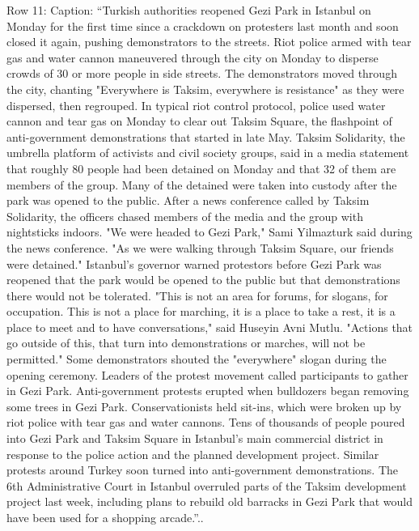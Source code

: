 \begin{table}[H]
\centering
\caption{Row 11\ifshowcaption{}: Caption: ``Turkish authorities reopened Gezi Park in Istanbul on Monday for the first time since a crackdown on protesters last month and soon closed it again, pushing demonstrators to the streets. Riot police armed with tear gas and water cannon maneuvered through the city on Monday to disperse crowds of 30 or more people in side streets. The demonstrators moved through the city, chanting "Everywhere is Taksim, everywhere is resistance" as they were dispersed, then regrouped. In typical riot control protocol, police used water cannon and tear gas on Monday to clear out Taksim Square, the flashpoint of anti-government demonstrations that started in late May. Taksim Solidarity, the umbrella platform of activists and civil society groups, said in a media statement that roughly 80 people had been detained on Monday and that 32 of them are members of the group. Many of the detained were taken into custody after the park was opened to the public. After a news conference called by Taksim Solidarity, the officers chased members of the media and the group with nightsticks indoors. "We were headed to Gezi Park," Sami Yilmazturk said during the news conference. "As we were walking through Taksim Square, our friends were detained." Istanbul's governor warned protestors before Gezi Park was reopened that the park would be opened to the public but that demonstrations there would not be tolerated. "This is not an area for forums, for slogans, for occupation. This is not a place for marching, it is a place to take a rest, it is a place to meet and to have conversations," said Huseyin Avni Mutlu. "Actions that go outside of this, that turn into demonstrations or marches, will not be permitted." Some demonstrators shouted the "everywhere" slogan during the opening ceremony. Leaders of the protest movement called participants to gather in Gezi Park. Anti-government protests erupted when bulldozers began removing some trees in Gezi Park. Conservationists held sit-ins, which were broken up by riot police with tear gas and water cannons. Tens of thousands of people poured into Gezi Park and Taksim Square in Istanbul's main commercial district in response to the police action and the planned development project. Similar protests around Turkey soon turned into anti-government demonstrations. The 6th Administrative Court in Istanbul overruled parts of the Taksim development project last week, including plans to rebuild old barracks in Gezi Park that would have been used for a shopping arcade.''.\else.\fi}

\end{table}
